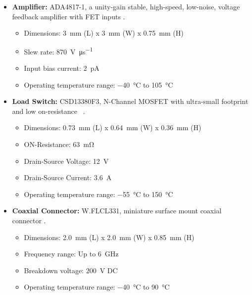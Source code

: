 \begin{itemize}[topsep=8pt,itemsep=4pt,partopsep=4pt, parsep=4pt]

    \item \textbf{Amplifier:} ADA4817-1, a
    unity-gain stable, high-speed, low-noise, voltage feedback
    amplifier with \ac{FET} inputs \autocite{analogdevices:ADA4817}.

    \begin{itemize}[topsep=8pt,itemsep=4pt,partopsep=4pt, parsep=4pt]
        \item Dimensions: \SI{3}{\milli\meter} (L) x \SI{3}{\milli\meter} (W)
        x \SI{0.75}{\milli\meter} (H)
        \item Slew rate: \SI{870}{\volt\per\micro\second}
        \item Input bias current: \SI{2}{\pico\ampere}
        \item Operating temperature range:
        \SI{-40}{\degreeCelsius} to \SI{105}{\degreeCelsius}
    \end{itemize}


    \item \textbf{Load Switch:} CSD13380F3, N-Channel
    \acs{MOSFET} with ultra-small footprint and low on-resistance
    ~\autocite{ti:CSD13380F3-datasheet}.

    \begin{itemize}[topsep=8pt,itemsep=4pt,partopsep=4pt, parsep=4pt]
        \item Dimensions: \SI{0.73}{\milli\meter} (L) x \SI{0.64}{\milli\meter} (W)
        x \SI{0.36}{\milli\meter} (H)
        \item ON-Resistance: \SI{63}{\milli\ohm}
        \item Drain-Source Voltage: \SI{12}{\volt}
        \item Drain-Source Current: \SI{3.6}{\ampere}
        \item Operating temperature range:
        \SI{-55}{\degreeCelsius} to \SI{150}{\degreeCelsius}
    \end{itemize}

    \item \textbf{Coaxial Connector:} W.FLCL331, miniature surface mount
    coaxial connector \autocite{hirose:wflcl331-datasheet}.

    \begin{itemize}[topsep=8pt,itemsep=4pt,partopsep=4pt, parsep=4pt]
        \item Dimensions: \SI{2.0}{\milli\meter} (L) x \SI{2.0}{\milli\meter} (W)
        x \SI{0.85}{\milli\meter} (H)
        \item Frequency range: Up to \SI{6}{\giga\hertz}
        \item Breakdown voltage: \SI{200}{\volt} \acs{DC}
        \item Operating temperature range:
        \SI{-40}{\degreeCelsius} to \SI{90}{\degreeCelsius}
    \end{itemize}

\end{itemize}

